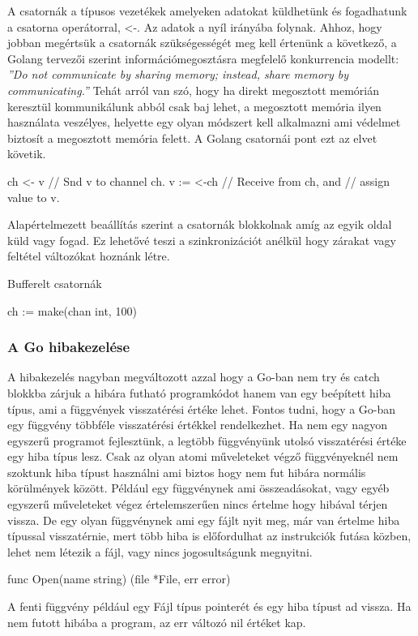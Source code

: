 A csatornák a típusos vezetékek amelyeken adatokat küldhetünk és fogadhatunk a csatorna operátorral, <-.
Az adatok a nyíl irányába folynak. Ahhoz, hogy jobban megértsük a csatornák szükségességét meg kell értenünk a következő, a Golang tervezői szerint információmegosztásra megfelelő konkurrencia modellt:
\emph{''Do not communicate by sharing memory; instead, share memory by communicating.''}
Tehát arról van szó, hogy ha direkt megosztott memórián keresztül kommunikálunk abból csak baj lehet, a megosztott memória ilyen használata veszélyes, helyette egy olyan módszert
kell alkalmazni ami védelmet biztosít a megosztott memória felett. A Golang csatornái pont ezt az elvet követik.
\begin{python}
    ch <- v    // Snd v to channel ch.
    v := <-ch  // Receive from ch, and
    // assign value to v.
\end{python}
Alapértelmezett beaállítás szerint a csatornák blokkolnak amíg az egyik oldal küld vagy fogad.
Ez lehetővé teszi a szinkronizációt anélkül hogy zárakat vagy feltétel változókat hoznánk létre.

Bufferelt csatornák
\begin{python}
    ch := make(chan int, 100)
\end{python}


\subsubsection{A Go hibakezelése}
A hibakezelés nagyban megváltozott azzal hogy a Go-ban nem try és catch blokkba zárjuk a hibára futható programkódot
hanem van egy beépített hiba típus, ami a függvények visszatérési értéke lehet. Fontos tudni, hogy a Go-ban egy függvény többféle
visszatérési értékkel rendelkezhet. Ha nem egy nagyon egyszerű programot fejlesztünk, a legtöbb függvényünk utolsó visszatérési értéke egy hiba típus lesz.
Csak az olyan atomi műveleteket végző függvényeknél nem szoktunk hiba típust használni ami biztos hogy nem fut hibára normális körülmények között.
Például egy függvénynek ami összeadásokat, vagy egyéb egyszerű műveleteket végez értelemszerűen nincs értelme hogy hibával térjen vissza.
De egy olyan függvénynek ami egy fájlt nyit meg, már van értelme hiba típussal visszatérnie, mert több hiba is előfordulhat az instrukciók futása közben, lehet nem létezik a fájl, vagy nincs jogosultságunk megnyitni.
\begin{python}
    func Open(name string) (file *File, err error)
\end{python}
A fenti függvény például egy Fájl típus pointerét és egy hiba típust ad vissza. Ha nem futott hibába a program, az err változó nil értéket kap.

